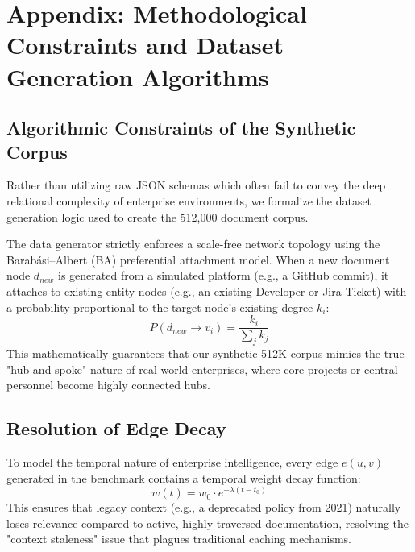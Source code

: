 
\appendix
\section{Appendix: Methodological Constraints and Dataset Generation Algorithms}
\label{sec:appendix}

\subsection{Algorithmic Constraints of the Synthetic Corpus}
Rather than utilizing raw JSON schemas which often fail to convey the deep relational complexity of enterprise environments, we formalize the dataset generation logic used to create the 512,000 document corpus.

The data generator strictly enforces a scale-free network topology using the Barabási–Albert (BA) preferential attachment model. When a new document node $d_{new}$ is generated from a simulated platform (e.g., a GitHub commit), it attaches to existing entity nodes (e.g., an existing Developer or Jira Ticket) with a probability proportional to the target node's existing degree $k_i$:
\begin{equation}
P(d_{new} \rightarrow v_i) = \frac{k_i}{\sum_j k_j}
\end{equation}
This mathematically guarantees that our synthetic 512K corpus mimics the true "hub-and-spoke" nature of real-world enterprises, where core projects or central personnel become highly connected hubs.

\subsection{Resolution of Edge Decay}
To model the temporal nature of enterprise intelligence, every edge $e(u,v)$ generated in the benchmark contains a temporal weight decay function:
\begin{equation}
w(t) = w_0 \cdot e^{-\lambda (t - t_0)}
\end{equation}
This ensures that legacy context (e.g., a deprecated policy from 2021) naturally loses relevance compared to active, highly-traversed documentation, resolving the "context staleness" issue that plagues traditional caching mechanisms.
